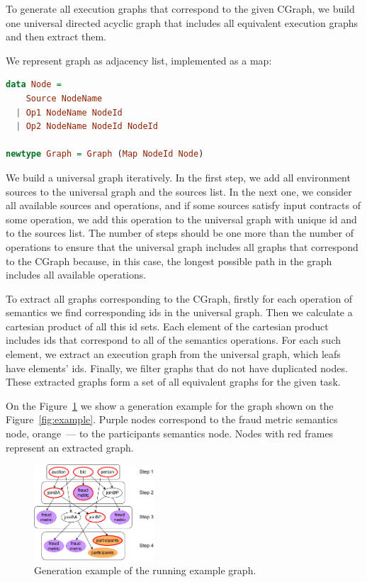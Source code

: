To generate all execution graphs that correspond to the given CGraph, we build one universal directed acyclic graph that includes all equivalent execution graphs and then extract them.

We represent graph as adjacency list, implemented as a map:

\begin{lstlisting}[language=Haskell]
data Node =
    Source NodeName
  | Op1 NodeName NodeId
  | Op2 NodeName NodeId NodeId

newtype Graph = Graph (Map NodeId Node)
\end{lstlisting}


We build a universal graph iteratively.
In the first step, we add all environment sources to the universal graph and the sources list.
In the next one, we consider all available sources and operations, and if some sources satisfy input contracts of some operation, we add this operation to the universal graph with unique id and to the sources list.
The number of steps should be one more than the number of operations to ensure that the universal graph includes all graphs that correspond to the CGraph because, in this case, the longest possible path in the graph includes all available operations.

To extract all graphs corresponding to the CGraph, firstly for each operation of semantics we find corresponding ids in the universal graph.
Then we calculate a cartesian product of all this id sets.
Each element of the cartesian product includes ids that correspond to all of the semantics operations.
For each such element, we extract an execution graph from the universal graph, which leafs have elements' ids.
Finally, we filter graphs that do not have duplicated nodes.
These extracted graphs form a set of all equivalent graphs for the given task.

On the Figure~\ref{fig:gen} we show a generation example for the graph shown on the Figure~\ref{fig:example}.
Purple nodes correspond to the fraud metric semantics node, orange~--- to the participants semantics node.
Nodes with red frames represent an extracted graph.

\begin{figure}
    \flushright
    \includegraphics[width=0.4\textwidth]{images/generation}
    \caption{Generation example of the running example graph.}
    \label{fig:gen}
\end{figure}

